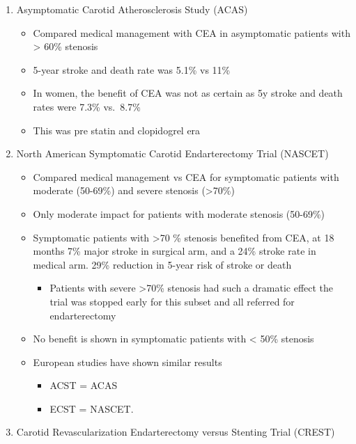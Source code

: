 \documentclass[
]{book}
\providecommand{\tightlist}{%
  \setlength{\itemsep}{0pt}\setlength{\parskip}{0pt}}
\begin{document}
\begin{enumerate}
\def\labelenumi{\arabic{enumi}.}
\item
  Asymptomatic Carotid Atherosclerosis Study (ACAS)

  \begin{itemize}
  \item
    Compared medical management with CEA in asymptomatic patients
    with \textgreater{} 60\% stenosis
  \item
    5-year stroke and death rate was 5.1\% vs 11\%
  \item
    In women, the benefit of CEA was not as certain as 5y stroke and
    death rates were 7.3\% vs.~8.7\%
  \item
    This was pre statin and clopidogrel era
  \end{itemize}
\item
  North American Symptomatic Carotid Endarterectomy Trial (NASCET)
  \citet{northamericansymptomaticcarotidendarterectomytrialcollaboratorsBeneficialEffectCarotid1991}

  \begin{itemize}
  \item
    Compared medical management vs CEA for symptomatic patients with
    moderate (50-69\%) and severe stenosis (\textgreater70\%)
  \item
    Only moderate impact for patients with moderate stenosis
    (50-69\%)
  \item
    Symptomatic patients with \textgreater70 \% stenosis benefited from CEA, at
    18 months 7\% major stroke in surgical arm, and a 24\% stroke rate
    in medical arm. 29\% reduction in 5-year risk of stroke or death

    \begin{itemize}
    \tightlist
    \item
      Patients with severe \textgreater70\% stenosis had such a dramatic
      effect the trial was stopped early for this subset and all
      referred for endarterectomy
    \end{itemize}
  \item
    No benefit is shown in symptomatic patients with \textless{} 50\% stenosis
  \item
    European studies have shown similar results

    \begin{itemize}
    \item
      ACST = ACAS
    \item
      ECST = NASCET.
    \end{itemize}
  \end{itemize}
\item
  Carotid Revascularization Endarterectomy versus Stenting Trial
  (CREST)


\end{enumerate}
\end{document}
